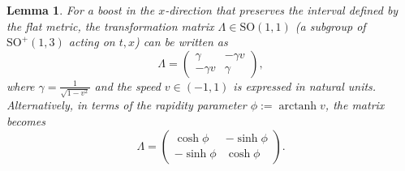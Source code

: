 \documentclass{amsart}
\newtheorem{lemma}[theorem]{Lemma}
\theoremstyle{definition}
\theoremstyle{remark}
\DeclareMathOperator{\arctanh}{arctanh}
\begin{document}
\begin{lemma}\label{lem:boost_x_direction_so11}
  For a boost in the $x$-direction that preserves the interval defined by the flat metric, the transformation matrix $\Lambda\in\mathrm{SO}(1,1)$ (a subgroup of $\mathrm{SO}^+(1,3)$ acting on $t,x$) can be written as
  \begin{equation*}
    \Lambda =
    \begin{pmatrix}
      \gamma & -\gamma v \\
      -\gamma v & \gamma
    \end{pmatrix},
  \end{equation*}
  where $\gamma = \frac{1}{\sqrt{1 - v^2}}$ and the \emph{speed} $v \in (-1,1)$ is expressed in natural units.
  Alternatively, in terms of the \emph{rapidity} parameter $\phi := \arctanh v$, the matrix becomes
  \begin{equation*}
    \Lambda =
    \begin{pmatrix}
      \cosh \phi & -\sinh \phi \\
      -\sinh \phi & \cosh \phi
    \end{pmatrix}.
  \end{equation*}
\end{lemma}
\end{document}
